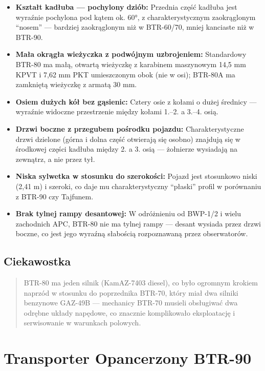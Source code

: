 \documentclass[12pt,oneside]{book}
\providecommand{\tightlist}{%
  \setlength{\itemsep}{0pt}\setlength{\parskip}{0pt}}
\begin{document}
\begin{itemize}
\tightlist
\item
  \textbf{Kształt kadłuba --- pochylony dziób:} Przednia część kadłuba
  jest wyraźnie pochylona pod kątem ok. 60°, z charakterystycznym
  zaokrąglonym ``nosem'' --- bardziej zaokrąglonym niż w BTR-60/70,
  mniej kanciaste niż w BTR-90.
\item
  \textbf{Mała okrągła wieżyczka z podwójnym uzbrojeniem:} Standardowy
  BTR-80 ma małą, otwartą wieżyczkę z karabinem maszynowym 14,5 mm KPVT
  i 7,62 mm PKT umieszczonym obok (nie w osi); BTR-80A ma zamkniętą
  wieżyczkę z armatą 30 mm.
\item
  \textbf{Osiem dużych kół bez gąsienic:} Cztery osie z kołami o dużej
  średnicy --- wyraźnie widoczne przestrzenie między kołami 1.--2. a
  3.--4. osią.
\item
  \textbf{Drzwi boczne z przegubem pośrodku pojazdu:} Charakterystyczne
  drzwi dzielone (górna i dolna część otwierają się osobno) znajdują się
  w środkowej części kadłuba między 2. a 3. osią --- żołnierze wysiadają
  na zewnątrz, a nie przez tył.
\item
  \textbf{Niska sylwetka w stosunku do szerokości:} Pojazd jest
  stosunkowo niski (2,41 m) i szeroki, co daje mu charakterystyczny
  ``płaski'' profil w porównaniu z BTR-90 czy Tajfunem.
\item
  \textbf{Brak tylnej rampy desantowej:} W odróżnieniu od BWP-1/2 i
  wielu zachodnich APC, BTR-80 nie ma tylnej rampy --- desant wysiada
  przez drzwi boczne, co jest jego wyraźną słabością rozpoznawaną przez
  obserwatorów.
\end{itemize}

\subsection{Ciekawostka}\label{ciekawostka-15}

\begin{quote}
BTR-80 ma jeden silnik (KamAZ-7403 diesel), co było ogromnym krokiem
naprzód w stosunku do poprzednika BTR-70, który miał dwa silniki
benzynowe GAZ-49B --- mechanicy BTR-70 musieli obsługiwać dwa odrębne
układy napędowe, co znacznie komplikowało eksploatację i serwisowanie w
warunkach polowych.
\end{quote}

\section{Transporter Opancerzony
BTR-90}\label{transporter-opancerzony-btr-90}
\end{document}
